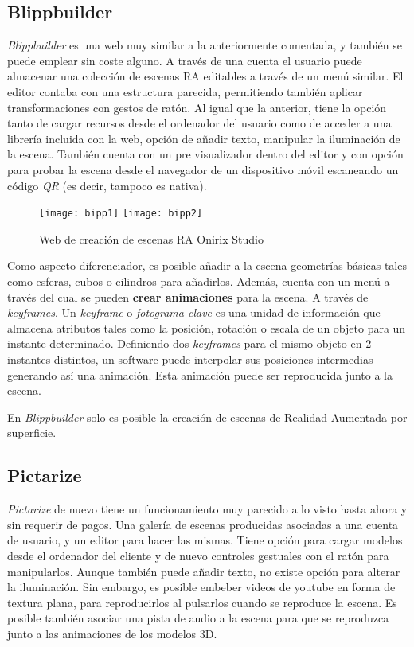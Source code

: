 \subsection{Blippbuilder}

\textit{Blippbuilder}\cite{Blippbuilder} es una web muy similar a la anteriormente comentada, y también se puede emplear sin coste alguno. A través de una cuenta el usuario puede almacenar una colección de escenas RA editables a través de un menú similar. El editor contaba con una estructura parecida, permitiendo también aplicar transformaciones con gestos de ratón. Al igual que la anterior, tiene la opción tanto de cargar recursos desde el ordenador del usuario como de acceder a una librería incluida con la web, opción de añadir texto, manipular la iluminación de la escena. También cuenta con un pre visualizador dentro del editor y con opción para probar la escena desde el navegador de un dispositivo móvil escaneando un código \textit{QR} (es decir, tampoco es nativa).

\begin{figure}[h]
    \centering
    \texttt{[image: bipp1]}
    \texttt{[image: bipp2]}
    \caption[Aplicación Onirix Studio]{Web de creación de escenas RA Onirix Studio}
\end{figure}

Como aspecto diferenciador, es posible añadir a la escena geometrías básicas tales como esferas, cubos o cilindros para añadirlos. Además, cuenta con un menú a través del cual se pueden \textbf{crear animaciones} para la escena. A través de \textit{keyframes}. Un \textit{keyframe} o \textit{fotograma clave} es una unidad de información que almacena atributos tales como la posición, rotación o escala de un objeto para un instante determinado. Definiendo dos \textit{keyframes} para el mismo objeto en 2 instantes distintos, un software puede interpolar sus posiciones intermedias generando así una animación. Esta animación puede ser reproducida junto a la escena.

En \textit{Blippbuilder} solo es posible la creación de escenas de Realidad Aumentada por superficie.

\subsection{Pictarize}
\textit{Pictarize}\cite{pictarize} de nuevo tiene un funcionamiento muy parecido a lo visto hasta ahora y sin requerir de pagos. Una galería de escenas producidas asociadas a una cuenta de usuario, y un editor para hacer las mismas. Tiene opción para cargar modelos desde el ordenador del cliente y de nuevo controles gestuales con el ratón para manipularlos. Aunque también puede añadir texto, no existe opción para alterar la iluminación. Sin embargo, es posible embeber videos de youtube en forma de textura plana, para reproducirlos al pulsarlos cuando se reproduce la escena. Es posible también asociar una pista de audio a la escena para que se reproduzca junto a las animaciones de los modelos 3D.

